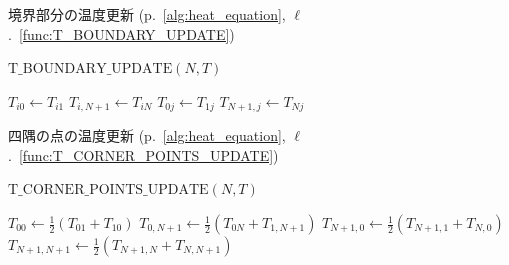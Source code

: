 \documentclass[dvipdfmx,aspectratio=169,20pt]{beamer}
\newcommand{\myfontsetting}[3]{{\fontsize{#1}{#2}\selectfont #3}}
\begin{document}
%

\begin{frame}{{\myfontsetting{22pt}{22pt}{[手法] 境界部分の温度更新}
\myfontsetting{18pt}{18pt}{(p.~\ref{alg:heat_equation}, $\mathbf{\ell}$.~\ref{func:T_BOUNDARY_UPDATE})}
}}

\begin{block}{\myfontsetting{15pt}{15pt}{$\mathrm{T\_BOUNDARY\_UPDATE}(N,T)$} \label{func:T_BOUNDARY_UPDATE}}
    \myfontsetting{14pt}{16pt}{
    \begin{algorithmic}[1]
        \FOR{$i = 1,\dots, N$}
		\STATE $T_{i0} \leftarrow T_{i1}$
		\STATE $T_{i,N+1} \leftarrow T_{iN}$
        \ENDFOR
        \FOR{$j = 1,\dots, N$}
		\STATE $T_{0j} \leftarrow T_{1j}$
		\STATE $T_{N+1,j} \leftarrow T_{Nj}$
        \ENDFOR
    \end{algorithmic}
    }
\end{block}
\end{frame}
\begin{frame}{{\myfontsetting{22pt}{22pt}{[手法] 四隅の点の温度更新}
\myfontsetting{18pt}{18pt}{(p.~\ref{alg:heat_equation}, $\mathbf{\ell}$.~\ref{func:T_CORNER_POINTS_UPDATE})}
}}

\begin{block}{\myfontsetting{15pt}{15pt}{$\mathrm{T\_CORNER\_POINTS\_UPDATE}(N,T)$} \label{func:T_CORNER_POINTS_UPDATE}}
    \myfontsetting{14pt}{16pt}{
    \begin{algorithmic}[1]
		\STATE $T_{00} \leftarrow \frac{1}{2}\left(T_{01}+T_{10}\right)$
		\STATE $T_{0,N+1} \leftarrow \frac{1}{2}\left(T_{0N}+T_{1,N+1}\right)$
		\STATE $T_{N+1,0} \leftarrow \frac{1}{2}\left(T_{N+1, 1}+T_{N,0}\right)$
		\STATE $T_{N+1,N+1} \leftarrow \frac{1}{2}\left(T_{N+1, N}+T_{N,N+1}\right)$
    \end{algorithmic}
    }
\end{block}
\end{frame}
\end{document}
